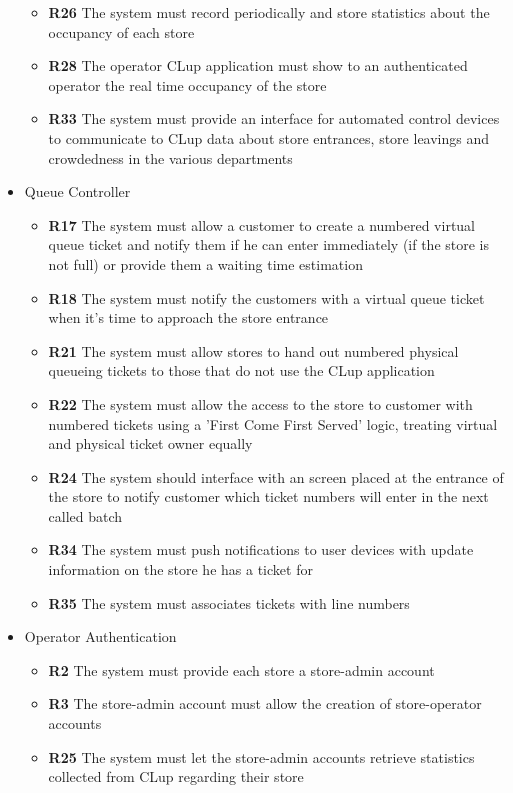 \begin{itemize}
\begin{itemize}
        \item \textbf{R26} The system must record periodically and store statistics about the occupancy of each store
        \item \textbf{R28} The operator CLup application must show to an authenticated operator the real time occupancy of the store
        \item \textbf{R33} The system must provide an interface for automated control devices to communicate to CLup data about store entrances, store leavings and crowdedness in the various departments
    \end{itemize}
    \item Queue Controller
    \begin{itemize}
        \item \textbf{R17} The system must allow a customer to create a numbered virtual queue ticket and notify them if he can enter immediately (if the store is not full) or provide them a waiting time estimation
        \item \textbf{R18} The system must notify the customers with a virtual queue ticket when it’s time to approach the store entrance
        \item \textbf{R21} The system must allow stores to hand out numbered physical queueing tickets to those that do not use the CLup application
        \item \textbf{R22} The system must allow the access to the store to customer with numbered tickets using a ’First Come First Served’ logic, treating virtual and physical ticket owner equally
        \item \textbf{R24} The system should interface with an screen placed at the entrance of the store to notify customer which ticket numbers will enter in the next called batch
        \item \textbf{R34} The system must push notifications to user devices with update information on the store he has a ticket for
        \item \textbf{R35} The system must associates tickets with line numbers
    \end{itemize}
    \item Operator Authentication
    \begin{itemize}
        \item \textbf{R2} The system must provide each store a store-admin account
        \item \textbf{R3} The store-admin account must allow the creation of store-operator accounts
        \item \textbf{R25} The system must let the store-admin accounts retrieve statistics collected from CLup regarding their store

\end{itemize}
\end{itemize}
